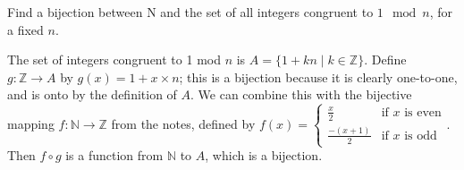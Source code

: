 \question Find a bijection between N and the set of all integers 
congruent to $1 \mod n$, for a fixed $n$.
\begin{solution} [1 in]
The set of integers congruent to 1 mod $n$ is $A = \{1 + kn \mid k \in \mathbb{Z}\}$. 
Define $g : \mathbb{Z} \to A$ by $g(x) = 1 + x \times n$; this is a bijection 
because it is clearly one-to-one, and is onto by the definition of $A$. 
We can combine this with the bijective mapping $f : \mathbb{N} \to \mathbb{Z}$ from the 
notes, defined by
$f(x) = \begin{cases}
\frac{x}{2} & \text{if $x$ is even} \\ 
\frac{-(x + 1)}{2} & \text{if $x$ is odd}
\end{cases}$.
Then $f \circ g$ is a function from $\mathbb{N}$ to $A$, which is a bijection.
\end{solution}